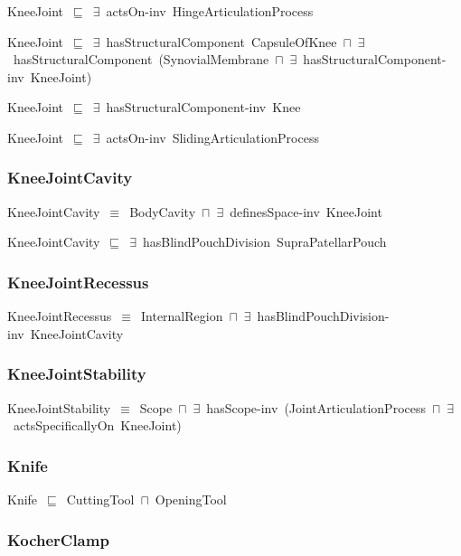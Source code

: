 \documentclass{article}
\begin{document}
KneeJoint~\ensuremath{\sqsubseteq}~\ensuremath{\exists}~actsOn-inv~HingeArticulationProcess~

KneeJoint~\ensuremath{\sqsubseteq}~\ensuremath{\exists}~hasStructuralComponent~CapsuleOfKnee~\ensuremath{\sqcap}~\ensuremath{\exists}~hasStructuralComponent~(SynovialMembrane~\ensuremath{\sqcap}~\ensuremath{\exists}~hasStructuralComponent-inv~KneeJoint)~

KneeJoint~\ensuremath{\sqsubseteq}~\ensuremath{\exists}~hasStructuralComponent-inv~Knee~

KneeJoint~\ensuremath{\sqsubseteq}~\ensuremath{\exists}~actsOn-inv~SlidingArticulationProcess~

\subsubsection*{KneeJointCavity}

KneeJointCavity~\ensuremath{\equiv}~BodyCavity~\ensuremath{\sqcap}~\ensuremath{\exists}~definesSpace-inv~KneeJoint

KneeJointCavity~\ensuremath{\sqsubseteq}~\ensuremath{\exists}~hasBlindPouchDivision~SupraPatellarPouch~

\subsubsection*{KneeJointRecessus}

KneeJointRecessus~\ensuremath{\equiv}~InternalRegion~\ensuremath{\sqcap}~\ensuremath{\exists}~hasBlindPouchDivision-inv~KneeJointCavity

\subsubsection*{KneeJointStability}

KneeJointStability~\ensuremath{\equiv}~Scope~\ensuremath{\sqcap}~\ensuremath{\exists}~hasScope-inv~(JointArticulationProcess~\ensuremath{\sqcap}~\ensuremath{\exists}~actsSpecificallyOn~KneeJoint)

\subsubsection*{Knife}

Knife~\ensuremath{\sqsubseteq}~CuttingTool~\ensuremath{\sqcap}~OpeningTool~

\subsubsection*{KocherClamp}
\end{document}
